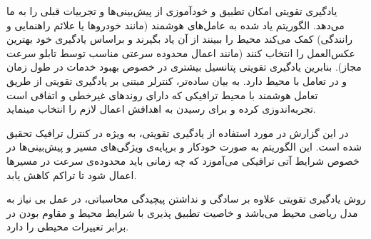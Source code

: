 یادگیری تقویتی امکان تطبیق و خودآموزی از پیش‌بینی‌ها و تجربیات قبلی را به ما می‌دهد. الگوریتم یاد شده به عامل‌های هوشمند (مانند خودروها یا علائم راهنمایی و رانندگی) کمک می‌کند محیط را ببینند از آن یاد بگیرند و براساس یادگیری خود بهترین عکس‌العمل را انتخاب کنند (مانند اعمال محدوده سرعتی مناسب توسط تابلو سرعت مجاز). بنابرین یادگیری تقویتی پتانسیل بیشتری در خصوص بهبود خدمات در طول زمان و در تعامل با محیط دارد.
به بيان ساده‌تر، کنترلر مبتنی بر يادگيری تقويتی از طريق
تعامل هوشمند با محيط ترافيكی که دارای روندهای غيرخطی و اتفاقی است تجربه‌اندوزی کرده و برای رسيدن به اهدافش اعمال لازم را
انتخاب مینمايد.

در این گزارش در مورد استفاده از یادگیری تقویتی، به ویژه  در کنترل ترافیک تحقیق شده است.
این الگوریتم به صورت خودکار و برپایه‌ی ویژگی‌های مسیر و پیش‌بینی‌ها در خصوص شرایط آتی ترافیکی می‌آموزد که چه زمانی باید محدوده‌ی سرعت در مسیرها اعمال شود تا تراکم کاهش یابد.

روش یادگیری تقویتی علاوه بر سادگی و نداشتن پیچیدگی محاسباتی، در عمل بی نیاز به مدل ریاضی محیط می‌باشد و خاصیت تطبیق پذیری با شرایط محیط و مقاوم بودن در برابر تغییرات محیطی را دارد.	